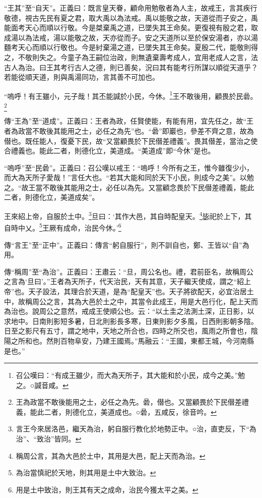 {\noindent\shu{}\fzkt “王其”至“自天”。正義曰：既言皇天眷，顧命用勉敬者為人主，故戒王，言其疾行敬德，視古先民有夏之君，取大禹以為法戒。禹以能敬之故，天道從而子安之，禹能面考天心而順以行敬。今是桀棄禹之道，已墜失其王命矣。更復視有殷之君，取成湯以為法戒，湯以能敬之故，天亦從而子。安之天道所以至於保安湯者，亦以湯麵考天心而順以行敬也。今是紂棄湯之道，已墜失其王命矣。夏殷二代，能敬則得之，不敬則失之。今童子為王嗣位治政，則無遺棄壽考成人，宜用老成人之言，法古人為治。曰王其考行古人之德，則已善矣，況曰其有能考行所謀以順從天道乎？若能從順天道，則與禹湯同功，言其善不可加也。 \par}

“嗚呼！有王雖小，元子哉！其丕能諴於小民，今休。\footnote{召公嘆曰：“有成王雖少，而大為天所子，其大能和於小民，成今之美。”勉之。○諴音咸。}王不敢後用，顧畏於民碞。\footnote{王為政當不敢後能用之士，必任之為先。碞，僣也。又當顧畏於下民僣差禮義，能此二者，則德化立，美道成也。○碞，五咸反，徐音吟。}


{\noindent\zhuan{}\fzbyks 傳“王為”至“道成”。正義曰：王者為政，任賢使能，有能有用，宜先任之，故“王者為政當不敢後其能用之士，必任之為先”也。“碞”即巖也，參差不齊之意，故為僣也。既任能人，復憂下民，故“又當顧畏於下民僣差禮義”。畏其僣差，當治之使合禮義也。能此二者，則德化立，美道成。“美道成”即“今休”是也。 \par}

{\noindent\shu{}\fzkt “嗚呼”至“民碞”。正義曰：召公嘆以戒王：“嗚呼！今所有之王，惟今雖復少小，而大為天所子愛哉！”言任大也。“若其大能和同於天下小民，則成今之美”。以勉之。“故王當不敢後其能用之士，必任以為先。又當顧念畏於下民僣差禮義，能此二者，則德化立，美道成矣”。 \par}

王來紹上帝，自服於土中。\footnote{言王今來居洛邑，繼天為治，躬自服行教化於地勢正中。○治，直吏反，下“為治”、“致治”皆同。}旦曰：‘其作大邑，其自時配皇天。\footnote{稱周公言，其為大邑於土中，其用是大邑，配上天而為治。}毖祀於上下，其自時中乂。\footnote{為治當慎祀於天地，則其用是土中大致治。}王厥有成命，治民今休。’\footnote{用是土中致治，則王其有天之成命，治民今獲太平之美。}


{\noindent\zhuan{}\fzbyks 傳“言王”至“正中”。正義曰：傳言“躬自服行”，則不訓自也，鄭、王皆以“自”為用。 \par}

{\noindent\zhuan{}\fzbyks 傳“稱周”至“為治”。正義曰：王肅云：“旦，周公名也。禮，君前臣名，故稱周公之言為‘旦曰’。”王者為天所子，代天治民，天有其意，天子繼天使成，謂之“紹上帝”也。天子設法，其理合於天道，是為“配皇天”也。天子將欲配天，必宜治居土中，故稱周公之言，其為大邑於土之中，其當令此成王，用是大邑行化，配上天而為治也。說周公之意然，戒成王使順公也。云：“以土圭之法測土深，正日影，以求地中。日南則影短多暑，日北則影長多寒，日東則影夕多風，日西則影朝多陰。日至之影尺有五寸，謂之地中，天地之所合也，四時之所交也，風雨之所會也，陰陽之所和也。然則百物阜安，乃建王國焉。”馬融云：“王國，東都王城，今河南縣是也。” \par}

